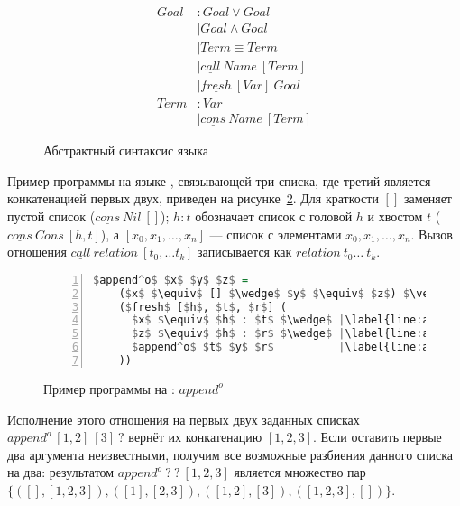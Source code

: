 \begin{figure}[h!]
    \begin{center}
    \begin{minipage}{0.5\textwidth}
    \begin{align*}
      Goal &: Goal \vee Goal \ \ \ \ \ \ \ \ \ \ \\
           &\mid Goal \wedge Goal \ \ \ \ \ \ \ \ \ \  \\
           &\mid Term \equiv Term \ \ \ \ \ \ \  \\
           &\mid \underline{call} \ Name \ [Term] \ \ \\
           &\mid \underline{fresh} \ [Var] \ Goal \ \ \\
      Term &: Var \\ 
           &\mid \underline{cons} \ Name \ [Term]
    \end{align*}
    \end{minipage}
    \end{center}
  \caption{Абстрактный синтаксис языка \miniKanren{}}
  \label{lst:miniKanren}
\end{figure}

Пример программы на языке \miniKanren{}, связывающей три списка, где третий является конкатенацией первых двух, приведен на рисунке~\ref{lst:appendo}. 
Для краткости $[]$ заменяет пустой список ($\underline{cons} \ Nil \ []$); $h : t$ обозначает список с головой $h$ и хвостом $t$ ($\underline{cons} \ Cons \ [h, t]$), а $[x_0, x_1, \dots, x_n]$ --- список с элементами $x_0, x_1, \dots, x_n$. 
Вызов отношения $\underline{call} \ relation \ [t_0, \dots t_k]$ записывается как $relation \ t_0 \dots \ t_k$.

\begin{figure}[h!]
  \begin{center}
  \begin{minipage}{0.32\textwidth}
    \begin{lstlisting}[language=Haskell, frame=single, numbers=left,numberstyle=\small, escapechar=|]
  $append^o$ $x$ $y$ $z$ =
    ($x$ $\equiv$ [] $\wedge$ $y$ $\equiv$ $z$) $\vee$ |\label{line:appendo2}|
    ($fresh$ [$h$, $t$, $r$] (
      $x$ $\equiv$ $h$ : $t$ $\wedge$ |\label{line:appendo4}|
      $z$ $\equiv$ $h$ : $r$ $\wedge$ |\label{line:appendo5}|
      $append^o$ $t$ $y$ $r$          |\label{line:appendo6}|
    ))
    \end{lstlisting}
  \end{minipage}
  \end{center}
  \caption{Пример программы на \miniKanren{}: $append^o$}
  \label{lst:appendo}
\end{figure}

Исполнение этого отношения на первых двух заданных списках \\ $append^o \ [1,2] \ [3] \ ?$ вернёт их конкатенацию $[1,2,3]$.
Если оставить первые два аргумента неизвестными, получим все возможные разбиения данного списка на два: результатом $append^o \ ? \ ? \ [1,2,3]$ является множество пар $\{([],[1,2,3]), ([1], [2,3]), ([1,2], [3]), ([1,2,3], [])\}$.
